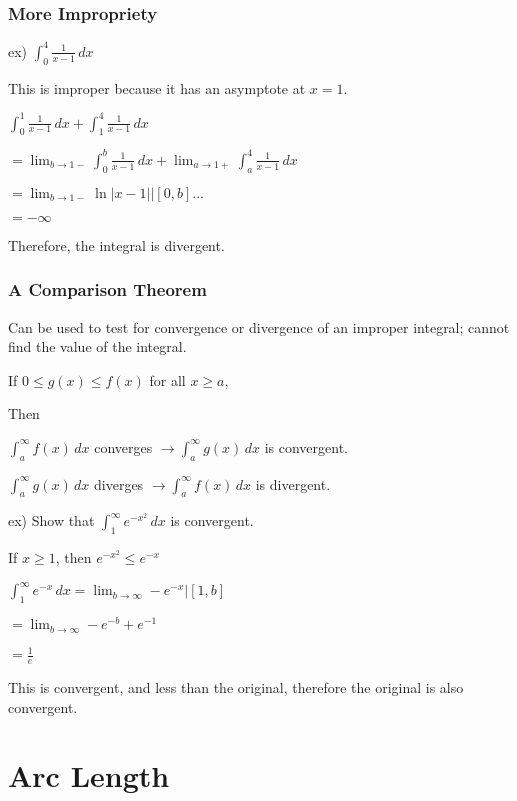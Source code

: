 \documentclass{article}
\begin{document}
\subsubsection{More Impropriety}

ex) $\int_{0}^{4} \frac{1}{x-1} \,dx$

This is improper because it has an asymptote at $x=1$.

$\int_{0}^{1} \frac{1}{x-1} \,dx + \int_{1}^{4} \frac{1}{x-1} \,dx$

$= \lim_{b\to1-}\int_{0}^{b} \frac{1}{x-1} \,dx + \lim_{a\to1+} \int_{a}^{4} \frac{1}{x-1} \,dx$

$=\lim_{b\to1-} \ln{|x-1|} |[0,b] ...$

$=\mathbf{-\infty}$

Therefore, the integral is divergent.

\subsubsection{A Comparison Theorem}

Can be used to test for convergence or divergence of an improper integral; cannot find the value of the integral.

\begin{center}
    If $0 \leq g(x) \leq f(x)$ for all $x \geq a$,
    
    Then 
    
    $\int_{a}^{\infty} f(x) \,dx $ converges $\rightarrow \int_{a}^{\infty} g(x) \,dx$ is convergent.
    
    $\int_{a}^{\infty} g(x) \,dx $ diverges $\rightarrow \int_{a}^{\infty} f(x) \,dx$ is divergent.
    
\end{center}

ex) Show that $\int_{1}^{\infty} e^{-x^2} \,dx$ is convergent.

If $x \geq 1$, then $e^{-x^2} \leq e^{-x}$

$\int_{1}^{\infty} e^{-x} \,dx = \lim_{b\to\infty} -e^{-x} | [1,b]$

$=\lim_{b\to\infty} -e^{-b} + e^{-1}$

$= \frac{1}{e}$

This is convergent, and less than the original, therefore the original is also convergent.

\section{Arc Length}
\end{document}

